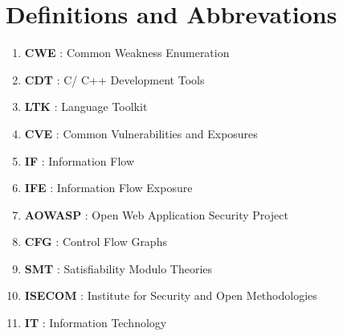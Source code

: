 \chapter{Definitions and Abbrevations}
\label{chapter:DetailedDescriptions}
\begin{enumerate}
\item \textbf{CWE} : Common Weakness Enumeration
\item \textbf{CDT} : C/ C++ Development Tools
\item \textbf{LTK} : Language Toolkit
\item \textbf{CVE} : Common Vulnerabilities and Exposures
\item \textbf{IF} : Information Flow
\item \textbf{IFE} : Information Flow Exposure
\item \textbf{AOWASP} : Open Web Application Security Project
\item \textbf{CFG} : Control Flow Graphs
\item \textbf{SMT} : Satisfiability Modulo Theories
\item \textbf{ISECOM} : Institute for Security and Open Methodologies
\item \textbf{IT} : Information Technology


\end{enumerate}

